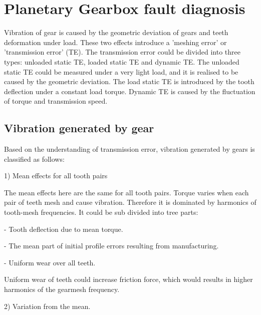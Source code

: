 \section{Planetary Gearbox fault diagnosis}

Vibration of gear is caused by the geometric deviation of gears and teeth deformation under load. These two effects introduce a 'meshing error' or 'transmission error' (TE). \cite{VBCM}The transmission error could be divided into three types: unloaded static TE, loaded static TE and dynamic TE. The unloaded static TE could be measured under a very light load, and it is realised to be caused by the geometric deviation. The load static TE is introduced by the tooth deflection under a constant load torque. Dynamic TE is caused by the fluctuation of torque and transmission speed.


\subsection{Vibration generated by gear}

Based on the understanding of transmission error, vibration generated by gears is classified as follows: \cite{VBCM}

1) Mean effects for all tooth pairs

The mean effects here are the same for all tooth pairs. Torque varies when each pair of teeth mesh and cause vibration. Therefore it is dominated by harmonics of tooth-mesh frequencies. It could be sub divided into tree parts: 

	- Tooth deflection due to mean torque.
		
	- The mean part of initial profile errors resulting from manufacturing.	
	
	- Uniform wear over all teeth.

Uniform wear of teeth could increase friction force, which would results in higher harmonics of the gearmesh frequency.

2) Variation from the mean.

